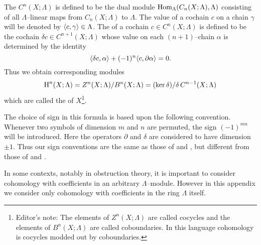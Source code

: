 \documentclass[../main]{subfiles}
\begin{document}
The  $C^n(X; \Lambda)$ is defined to be the dual module \newline $\operatorname{Hom}_\Lambda(C_n(X; \Lambda), \Lambda)$ consisting of all $\Lambda$--linear maps from $C_n(X; \Lambda)$ to $\Lambda$. The value of a cochain $c$ on a chain $\gamma$ will be denoted by $\langle c,\gamma\rangle \in \Lambda$. The  of a cochain $c \in C^n(X; \Lambda)$ is defined to be the cochain $\delta c \in C^{n + 1}(X; \Lambda)$ whose value on each $(n + 1)$--chain $\alpha$ is determined by the identity \[\langle\delta c,\alpha\rangle + (-1)^n \langle c,\partial \alpha\rangle = 0.\]
Thus we obtain corresponding modules \[\operatorname{H}^n(X; \Lambda) = Z^n(X; \Lambda)/B^n(X; \Lambda) = (\ker \delta)/\delta \, C^{n - 1}(X; \Lambda)\] which are called the  of $X$\footnote{Editor's note: The elements of $Z^n(X;\Lambda)$ are called cocycles and the elements of $B^n(X;\Lambda)$ are called coboundaries. In this language cohomology is cocycles modded out by coboundaries.}. 

\begin{remark*}
The choice of sign in this formula is based upon the following convention. Whenever two symbols of dimension $m$ and $n$ are permuted, the sign $(-1)^{mn}$ will be introduced. Here the operators $\partial$ and $\delta$ are considered to have dimension $\pm 1$. Thus our sign conventions are the same as those of \cite{maclane_1975} and \cite{dold1972}, but different from those of \cite{eilenbergsteenrod1952} and \cite{spanier1981}. 
\end{remark*}

In some contexts, notably in obstruction theory, it is important to consider cohomology with coefficients in an arbitrary $\Lambda$--module. However in this appendix we consider only cohomology with coefficients in the ring $\Lambda$ itself. 
\end{document}
